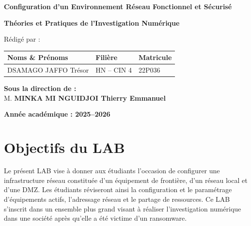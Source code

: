 \documentclass[12pt, a4paper]{article}
\begin{document}
\begin{titlepage}
	\noindent

	\vspace{1cm}

	{\Large \textbf{Configuration d'un Environnement Réseau Fonctionnel et Sécurisé}}

	\vspace{0.5cm}

	{\LARGE \textbf{Théories et Pratiques de l'Investigation Numérique}}

	\vspace{2cm}

	{\large Rédigé par :}

	\vspace{0.5cm}

	\begin{tabular}{|>{\centering\arraybackslash}m{8cm}
		|>{\centering\arraybackslash}m{4cm}
		|>{\centering\arraybackslash}m{3cm}|}
		\hline
		\textbf{Noms \& Prénoms} & \textbf{Filière} & \textbf{Matricule} \\
		\hline
		DSAMAGO JAFFO Trésor     & HN -- CIN 4      & 22P036             \\
		\hline
	\end{tabular}

	\vfill

	\begin{Large}
		\textbf{Sous la direction de :} \\
		M. \textbf{MINKA MI NGUIDJOI Thierry Emmanuel} \\
	\end{Large}

	\vspace{1cm}

	\textbf{Année académique : 2025--2026}
\end{titlepage}

\section{Objectifs du LAB}
Le présent LAB vise à donner aux étudiants l’occasion de configurer une
infrastructure réseau constituée d’un équipement de frontière, d’un réseau
local et d’une DMZ. Les étudiants réviseront ainsi la configuration et le
paramétrage d’équipements actifs, l’adressage réseau et le partage de
ressources. Ce LAB s’inscrit dans un ensemble plus grand visant à réaliser
l’investigation numérique dans une société après qu’elle a été victime d’un
ransomware.
\end{document}
